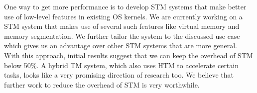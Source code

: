 \documentclass{sigplanconf}
\begin{document}
One way to get more performance is to develop STM systems that make
better use of low-level features in existing OS kernels.  We are
currently working on a STM system that makes use of several such
features like virtual memory and memory segmentation.  We further
tailor the system to the discussed use case which gives us an
advantage over other STM systems that are more general. With this
approach, initial results suggest that we can keep the overhead of STM
below 50\%. A hybrid TM system, which also uses HTM to accelerate
certain tasks, looks like a very promising direction of research
too. We believe that further work to reduce the overhead of STM is
very worthwhile.













\end{document}

